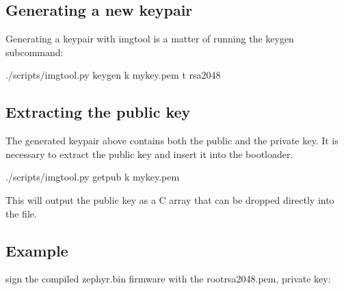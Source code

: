 \documentclass[letterpaper,10pt,english]{sphinxmanual}
\begin{document}
\subsection{Generating a new keypair}
\label{\detokenize{fota/signing:generating-a-new-keypair}}
Generating a keypair with imgtool is a matter of running the keygen
subcommand:

\begin{sphinxVerbatim}[commandchars=\\\{\}]
 ./scripts/imgtool.py keygen \PYGZhy{}k mykey.pem \PYGZhy{}t rsa\PYGZhy{}2048
\end{sphinxVerbatim}


\subsection{Extracting the public key}
\label{\detokenize{fota/signing:extracting-the-public-key}}
The generated keypair above contains both the public and the private
key.  It is necessary to extract the public key and insert it into the
bootloader.

\begin{sphinxVerbatim}[commandchars=\\\{\}]
 ./scripts/imgtool.py getpub \PYGZhy{}k mykey.pem
\end{sphinxVerbatim}

This will output the public key as a C array that can be dropped
directly into the  file.


\subsection{Example}
\label{\detokenize{fota/signing:example}}
sign the compiled zephyr.bin firmware with the root\sphinxhyphen{}rsa\sphinxhyphen{}2048.pem, private key:

\begin{sphinxVerbatim}[commandchars=\\\{\}]
\end{sphinxVerbatim}
\end{document}
